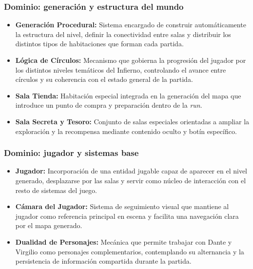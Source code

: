 \subsubsection{Dominio: generación y estructura del mundo}
\begin{itemize}
    \item \textbf{Generación Procedural:} Sistema encargado de construir automáticamente la
    estructura del nivel, definir la conectividad entre salas y distribuir los distintos
    tipos de habitaciones que forman cada partida.
    \item \textbf{Lógica de Círculos:} Mecanismo que gobierna la progresión del jugador por
    los distintos niveles temáticos del Infierno, controlando el avance entre círculos y
    su coherencia con el estado general de la partida.
    \item \textbf{Sala Tienda:} Habitación especial integrada en la generación del mapa
    que introduce un punto de compra y preparación dentro de la \textit{run}.
    \item \textbf{Sala Secreta y Tesoro:} Conjunto de salas especiales orientadas a
    ampliar la exploración y la recompensa mediante contenido oculto y botín específico.
\end{itemize}

\subsubsection{Dominio: jugador y sistemas base}
\begin{itemize}
    \item \textbf{Jugador:} Incorporación de una entidad jugable capaz de aparecer en
    el nivel generado, desplazarse por las salas y servir como núcleo de interacción con
    el resto de sistemas del juego.
    \item \textbf{Cámara del Jugador:} Sistema de seguimiento visual que mantiene al jugador
    como referencia principal en escena y facilita una navegación clara por el mapa
    generado.
    \item \textbf{Dualidad de Personajes:} Mecánica que permite trabajar con Dante y
    Virgilio como personajes complementarios, contemplando su alternancia y la persistencia
    de información compartida durante la partida.
\end{itemize}

